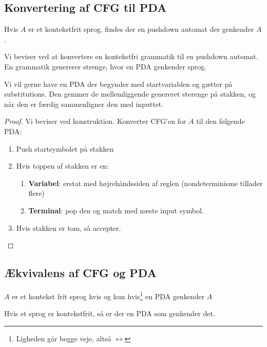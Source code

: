 \subsection{Konvertering af CFG til PDA}%
\label{subsec:pdacfgconvert}
\begin{theorem}
  \label{teo:pdacfgconvert}
Hvis $A$ er et kontekstfrit sprog, findes der en pushdown automat der genkender $A$.
\end{theorem}

Vi beviser ved at konvertere en kontekstfri grammatik til en pushdown automat. En grammatik genererer strenge, hvor en PDA genkender sprog.

Vi vil gerne have en PDA der begynder med startvariablen og gætter på substitutions. Den gemmer de mellemliggende genereret sterenge på stakken, og når den er færdig sammenligner den med inputtet.


\begin{proof}
  Vi beviser ved konstruktion. Konverter CFG'en for $A$ til den følgende PDA:
  \begin{enumerate}
    \item Push startsymbolet på stakken
    \item Hvis toppen af stakken er en:
          \begin{enumerate}
            \item \textbf{Variabel}: erstat med højrehåndssiden af reglen (nondeterminisme tillader flere)
            \item \textbf{Terminal}: pop den og match med næste input symbol.
          \end{enumerate}
    \item Hvis stakken er tom, så accepter.
  \end{enumerate}
\end{proof}


\subsection{Ækvivalens af CFG og PDA}%
\label{subsec:cfgpdaequiv}

\begin{theorem}
\label{teo:cfgpdaquiv}
$A$ er et kontekst frit sprog hvis og kun hvis\footnote{Ligheden går begge veje, altså $\leftrightarrow$} en PDA genkender $A$
\end{theorem}

\begin{lemma}
Hvis et sprog er kontekstfrit, så er der en PDA som genkender det.
\end{lemma}

